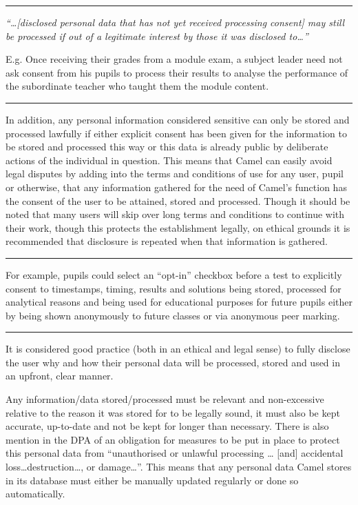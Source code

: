 	\vspace{0.35cm}
    \hrule
    {\raggedright \small \em “\ldots[disclosed personal data that has not yet received processing consent] may still be processed if out of a legitimate interest by those it was disclosed to\ldots”\par}
	{\raggedleft \scriptsize E.g. Once receiving their grades from a module exam, a subject leader need not ask consent from his pupils to process their results to analyse the performance of the subordinate teacher who taught them the module content.\par}
    \vspace{0.35cm}
    \hrule

    In addition, any personal information considered sensitive can only be stored and processed lawfully if either explicit consent has been given for the information to be stored and processed this way or this data is already public by deliberate actions of the individual in question.\cite{DPA:tDPP:S3} This means that Camel can easily avoid legal disputes by adding into the terms and conditions of use for any user, pupil or otherwise, that any information gathered for the need of Camel’s function has the consent of the user to be attained, stored and processed. Though it should be noted that many users will skip over long terms and conditions to continue with their work, though this protects the establishment legally, on ethical grounds it is recommended that disclosure is repeated when that information is gathered.

	\vspace{0.35cm}
    \hrule
    {\raggedleft \scriptsize For example, pupils could select an “opt-in” checkbox before a test to explicitly consent to timestamps, timing, results and solutions being stored, processed for analytical reasons and being used for educational purposes for future pupils either by being shown anonymously  to future classes or via anonymous peer marking.\par}
    \vspace{0.35cm}
    \hrule

    It is considered good practice (both in an ethical and legal sense) to fully disclose the user why and how their personal data will be processed, stored and used in an upfront, clear manner. 

    Any information/data stored/processed must be relevant and non-excessive relative to the reason it was stored for to be legally sound, it must also be kept accurate, up-to-date and not be kept for longer than necessary. There is also mention in the DPA of an obligation for measures to be put in place to protect this personal data from “unauthorised or unlawful processing … [and] accidental loss\ldots destruction\ldots, or damage\ldots”.\cite{DPA:tDPP:S1} This means that any personal data Camel stores in its database must either be manually updated regularly or done so automatically.

